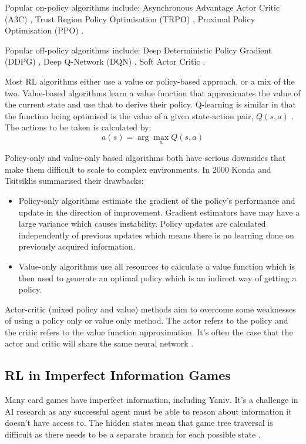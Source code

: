 \documentclass[../main.tex]{subfiles}
\begin{document}
Popular on-policy algorithms include: Asynchronous Advantage Actor Critic (A3C) \cite{mnih_asynchronous_2016}, Trust Region Policy Optimisation (TRPO) \cite{schulman_trust_2017}, Proximal Policy Optimisation (PPO) \cite{schulman_proximal_2017}.

Popular off-policy algorithms include: Deep Deterministic Policy Gradient (DDPG) \cite{lillicrap_continuous_2019}, Deep Q-Network (DQN) \cite{silver_mastering_2016}, Soft Actor Critic \cite{haarnoja_soft_2018}.

Most RL algorithms either use a value or policy-based approach, or a mix of the two. Value-based algorithms learn a value function that approximates the value of the current state and use that to derive their policy. Q-learning is similar in that the function being optimised is the value of a given state-action pair, $Q(s, a)$ \cite{watkins_q-learning_1992}. The actions to be taken is calculated by:
$$
a(s) = \arg\!\max_{a} Q(s,a)
$$

Policy-only and value-only based algorithms both have serious downsides that make them difficult to scale to complex environments. In 2000 Konda and Tsitsiklis \cite{konda_actor-critic_2000} summarised their drawbacks:

\begin{itemize}
  \item  Policy-only algorithms estimate the gradient of the policy's performance and update in the direction of improvement. Gradient estimators have may have a large variance which causes instability. Policy updates are calculated independently of previous updates which means there is no learning done on previously acquired information. 
  \item  Value-only algorithms use all resources to calculate a value function which is then used to generate an optimal policy which is an indirect way of getting a policy. 
\end{itemize}

Actor-critic (mixed policy and value) methods aim to overcome some weaknesses of using a policy only or value only method. The actor refers to the policy and the critic refers to the value function approximation. It's often the case that the actor and critic will share the same neural network \cite{mnih_asynchronous_2016}. 


\subsection{RL in Imperfect Information Games}
Many card games have imperfect information, including Yaniv. It's a challenge in AI research as any successful agent must be able to reason about information it doesn't have access to. The hidden states mean that game tree traversal is difficult as there needs to be a separate branch for each possible state \cite{seitz_learning_nodate}. 
\end{document}
